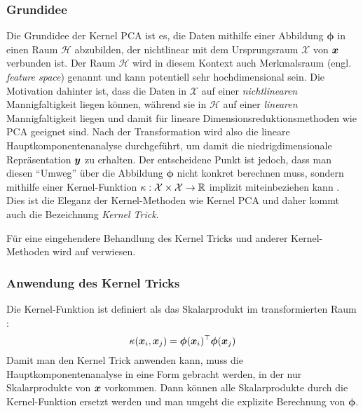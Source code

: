 \subsubsection{Grundidee}
\label{ch:MethodenDerDimRed:statistisch:kPCA:Grundidee}

Die Grundidee der Kernel PCA ist es, die Daten mithilfe einer Abbildung $\bm{\phi}$ in einen Raum
$\mathcal{H}$ abzubilden, der nichtlinear mit dem Ursprungsraum  $\mathcal{X}$ von $\bm{x}$
verbunden ist. Der Raum $\mathcal{H}$ wird in diesem Kontext auch Merkmalsraum (engl.
\textit{feature space}) genannt und kann potentiell sehr hochdimensional sein. Die Motivation
dahinter ist, dass die Daten in $\mathcal{X}$ auf einer \textit{nichtlinearen} Mannigfaltigkeit
liegen können, während sie in $\mathcal{H}$ auf einer \textit{linearen} Mannigfaltigkeit liegen und
damit für lineare Dimensionsreduktionsmethoden wie PCA geeignet sind. Nach der Transformation wird
also die lineare Hauptkomponentenanalyse durchgeführt, um damit die niedrigdimensionale
Repräsentation $\bm{y}$ zu erhalten. Der entscheidene Punkt ist jedoch, dass man diesen
\enquote{Umweg} über die Abbildung $\bm{\phi}$ nicht konkret berechnen muss, sondern mithilfe einer
Kernel-Funktion $\kappa: \mathcal{X} \times \mathcal{X} \rightarrow \mathbb{R}$ implizit miteinbeziehen
kann \parencites[586 -- 588]{Bishop.2006}[583]{Scholkopf.1997}. Dies ist die Eleganz der Kernel-Methoden wie
Kernel PCA und daher kommt auch die Bezeichnung \textit{Kernel Trick}.

Für eine eingehendere Behandlung des Kernel Tricks und anderer Kernel-Methoden wird auf
\textcite{ShaweTaylor.2011} verwiesen.

\subsubsection{Anwendung des Kernel Tricks}
\label{ch:MethodenDerDimRed:statistisch:kPCA:AnwendungKernelTrick}

Die Kernel-Funktion ist definiert als das Skalarprodukt im transformierten Raum \parencite[60]{ShaweTaylor.2011}:
\begin{equation}
	\kappa(\bm{x}_i, \bm{x}_j) = \bm{\phi}(\bm{x}_i)^\top \bm{\phi}(\bm{x}_j)
\end{equation}
Damit man den Kernel Trick anwenden kann, muss die Hauptkomponentenanalyse in eine Form gebracht werden, in der nur Skalarprodukte von $\bm{x}$ vorkommen. Dann können alle Skalarprodukte durch die Kernel-Funktion ersetzt werden \parencite[586]{Bishop.2006} und man umgeht die explizite Berechnung von $\bm{\phi}$.

